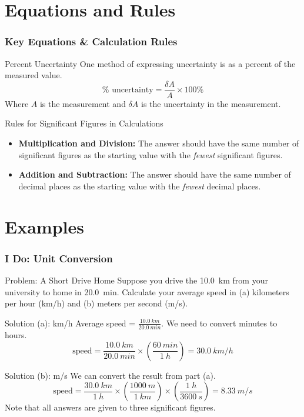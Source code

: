 \documentclass{beamer}
\begin{document}
\section{Equations and Rules}
\begin{frame}
    \frametitle{Key Equations \& Calculation Rules}
    \begin{block}{Percent Uncertainty}
        One method of expressing uncertainty is as a percent of the measured value.
        \pause
        \[ \% \text{ uncertainty} = \frac{\delta A}{A} \times 100\% \]
        \pause
        Where \(A\) is the measurement and \(\delta A\) is the uncertainty in the measurement.
    \end{block}
    \pause
    \begin{block}{Rules for Significant Figures in Calculations}
        \begin{itemize}
            \item \textbf{Multiplication and Division:} The answer should have the same number of significant figures as the starting value with the \textit{fewest} significant figures.
            \pause
            \item \textbf{Addition and Subtraction:} The answer should have the same number of decimal places as the starting value with the \textit{fewest} decimal places.
        \end{itemize}
    \end{block}
\end{frame}

\section{Examples}
\begin{frame}
    \frametitle{I Do: Unit Conversion}
    \begin{exampleblock}{Problem: A Short Drive Home}
        Suppose you drive the \SI{10.0}{km} from your university to home in \SI{20.0}{min}. Calculate your average speed in (a) kilometers per hour (km/h) and (b) meters per second (m/s).
    \end{exampleblock}
    \pause
    \begin{block}{Solution (a): km/h}
        Average speed = \(\frac{\SI{10.0}{km}}{\SI{20.0}{min}}\). We need to convert minutes to hours.
        \pause
        \[ \text{speed} = \frac{\SI{10.0}{km}}{\SI{20.0}{min}} \times \left( \frac{\SI{60}{min}}{\SI{1}{h}} \right) = \SI{30.0}{km/h} \]
    \end{block}
    \pause
    \begin{block}{Solution (b): m/s}
        We can convert the result from part (a).
        \pause
        \[ \text{speed} = \frac{\SI{30.0}{km}}{\SI{1}{h}} \times \left( \frac{\SI{1000}{m}}{\SI{1}{km}} \right) \times \left( \frac{\SI{1}{h}}{\SI{3600}{s}} \right) = \SI{8.33}{m/s} \]
        \pause
        Note that all answers are given to three significant figures.
    \end{block}
\end{frame}
\end{document}
